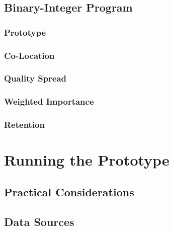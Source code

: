 \documentclass[mnsc,nonblindrev]{informs3} %
\begin{document}


\subsection{Binary-Integer Program}
\label{Matching}



\subsubsection{Prototype}



\subsubsection{Co-Location}
\label{CoLocation}



\subsubsection{Quality Spread}
\label{QualitySpread}



\subsubsection{Weighted Importance}
\label{Importance}



\subsubsection{Retention}
\label{Retention}



\section{Running the Prototype}

\subsection{Practical Considerations}



\subsection{Data Sources}
\end{document}
